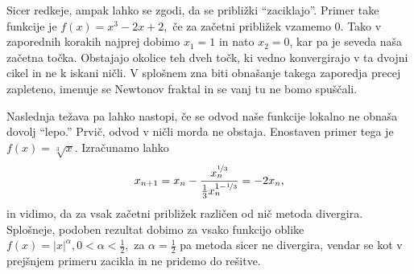 \documentclass[12pt,a4paper]{amsart}
\theoremstyle{definition} %
\theoremstyle{plain} %
\begin{document}
Sicer redkeje, ampak lahko se zgodi, da se približki "`zaciklajo"'. Primer take funkcije je $f(x) = x^3 - 2x + 2,$ če za začetni približek vzamemo 0. Tako v zaporednih korakih najprej dobimo
$x_{1} = 1$ in nato $x_{2} = 0$, kar pa je seveda naša začetna točka. Obstajajo okolice teh dveh točk, ki vedno konvergirajo v ta dvojni cikel in ne k iskani ničli. V splošnem 
zna biti obnašanje takega zaporedja precej zapleteno, imenuje se Newtonov fraktal in se vanj tu ne bomo spuščali.

Naslednja težava pa lahko nastopi, če se odvod naše funkcije lokalno ne obnaša dovolj "`lepo."' Prvič, odvod v ničli morda ne obstaja. Enostaven primer tega je 
$f(x) = \sqrt[3]{x}.$ Izračunamo lahko
\[
    x_{n+1} = x_{n} - \frac{x_{n} ^ {\nicefrac{1}{3}}}{\frac{1}{3}x_{n}^{1 - \nicefrac{1}{3}}} = -2x_{n},
\]
in vidimo, da za vsak začetni približek različen od nič metoda divergira. Splošneje, podoben rezultat dobimo za vsako funkcijo oblike $f(x) = \lvert x \rvert^{\alpha}, 0 < \alpha < \frac{1}{2},$
za $\alpha = \frac{1}{2}$ pa metoda sicer ne divergira, vendar se kot v prejšnjem primeru zacikla in ne pridemo do rešitve.
\end{document}
